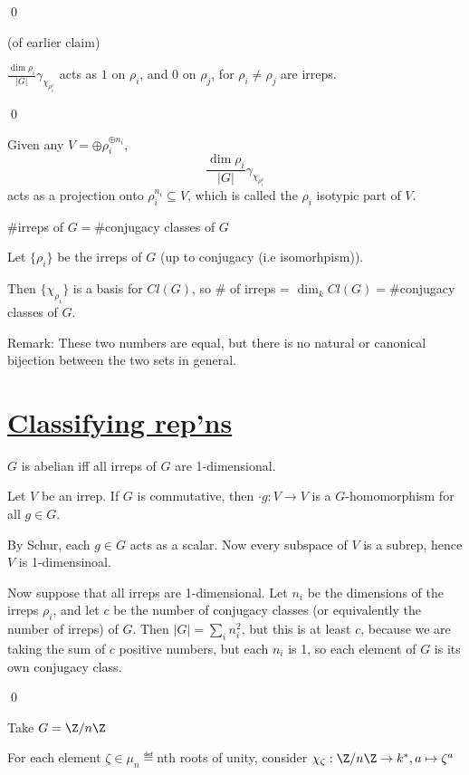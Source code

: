 \documentclass[x11names,reqno,14pt]{extarticle}
\begin{document}
\qed

\cor(of earlier claim)

$\frac{\dim\rho_i}{|G|}\gamma_{\chi_{\rho_i^v}}$ acts as $1$ on $\rho_i$, and 0 on $\rho_j$, for $\rho_i\neq\rho_j$ are irreps. 

\proof

\qed

\cor

Given any $V = \oplus\rho_i^{\oplus n_i}$, 
\[
\frac{\dim\rho_i}{|G|}\gamma_{\chi_{\rho_i^v}}
\]
acts as a projection onto $\rho_i^{n_i}\subseteq V$, which is called the $\rho_i$ isotypic part of $V$. 

\cor

$\#$irreps of $G = \#$conjugacy classes of $G$

\proof

Let $\{\rho_i\}$ be the irreps of $G$ (up to conjugacy (i.e isomorhpism)). 

Then $\{\chi_{\rho_i}\}$ is a basis for $Cl(G)$, so $\#$ of irreps = $\dim_kCl(G) = \#$conjugacy classes of $G$.

Remark: These two numbers are equal, but there is no natural or canonical bijection between the two sets in general.

\section*{\underline{Classifying rep'ns}}

\thm $G$ is abelian iff all irreps of $G$ are 1-dimensional.

\proof

Let $V$ be an irrep. If $G$ is commutative, then $\cdot g :V\to V$ is a $G$-homomorphism for all $g\in G$. 

By Schur, each $g \in G$ acts as a scalar. Now every subspace of $V$ is a subrep, hence $V$ is 1-dimensinoal. 

Now suppose that all irreps are 1-dimensional. Let $n_i$ be the dimensions of the irreps $\rho_i$, and let $c$ be the number of conjugacy classes (or equivalently the number of irreps) of $G$. Then $|G| = \sum_in_i^2$, but this is at least $c$, because we are taking the sum of $c$ positive numbers, but each $n_i$ is 1, so each element of $G$ is its own conjugacy class. 

\qed

\exm

Take $G = \Z/n\Z$

For each element $\zeta \in \mu_n \eqdef $nth roots of unity, consider $\chi_\zeta:\Z/n\Z \to k^*, a \mapsto \zeta^a$
\end{document}
